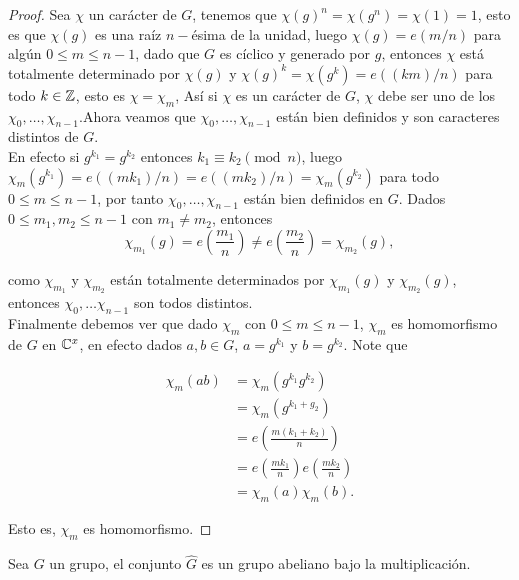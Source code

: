 \begin{proof}
Sea $\chi$ un carácter de $G$, tenemos que $\chi(g)^n=\chi(g^n)=\chi(1)=1$, esto es que $\chi(g)$ es una raíz $n-$ésima de la unidad, luego $\chi(g)=e(m/n)$ para algún $0\leq m\leq n-1$, dado  que $G$ es cíclico y generado por $g$, entonces $\chi$ está totalmente determinado por $\chi(g)$ y $\chi(g)^k=\chi(g^k)=e((km)/n)$ para todo $k\in \mathbb{Z}$, esto es $\chi=\chi_m$, Así si $\chi$ es un carácter de $G$, $\chi$ debe ser uno de los $\chi_0,\ldots,\chi_{n-1}$.Ahora veamos que $\chi_0,\ldots,\chi_{n-1}$ están bien definidos y son caracteres distintos de $G$.\\

En efecto si $g^{k_1}=g^{k_2}$ entonces $k_1\equiv k_2\pmod{n}$, luego $\chi_m(g^{k_1})=e\left((mk_1)/n\right)=e\left((mk_2)/n\right)=\chi_m(g^{k_2})$ para todo $0\leq m\leq n-1$, por tanto $\chi_0,\ldots,\chi_{n-1}$ están bien definidos en $G$. Dados $0\leq m_1,m_2\leq n-1$ con $m_1\neq m_2$, entonces
$$\displaystyle\chi_{m_1}(g)=e\left(\frac{m_1}{n}\right)\neq e\left(\frac{m_2}{n}\right)=\chi_{m_2}(g),$$

como $\chi_{m_1}$ y $\chi_{m_2}$ están totalmente determinados por $\chi_{m_1}(g)$ y $\chi_{m_2}(g)$, entonces $\chi_0,\ldots\chi_{n-1}$ son todos distintos.\\

Finalmente debemos ver que dado $\chi_m$ con $0\leq m\leq n-1$, $\chi_m$ es homomorfismo de $G$ en $\mathbb{C}^{x}$, en efecto dados $a,b\in G$, $a=g^{k_1}$ y $b=g^{k_2}$. Note que

\begin{align*}
\chi_m(ab)&=\chi_m(g^{k_1}g^{k_2})\\
&=\chi_m(g^{k_1+g_2})\\
&=e\left(\frac{m(k_1+k_2)}{n}\right)\\
&=e\left(\frac{mk_1}{n}\right)e\left(\frac{mk_2}{n}\right)\\
&=\chi_m(a)\chi_m(b)
.\end{align*}

Esto es, $\chi_m$ es homomorfismo.
\end{proof}

\begin{theorem}
Sea $G$ un grupo, el  conjunto $\widehat{G}$ es un grupo abeliano bajo la multiplicación.
\end{theorem}

